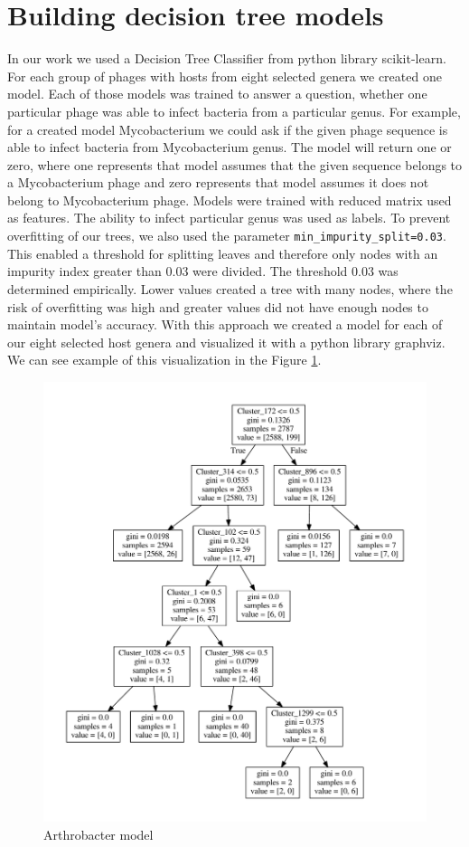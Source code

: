 \section{Building decision tree models}
In our work we used a Decision Tree Classifier from python library scikit-learn.
For each group of phages with hosts from eight selected genera we created one model.
Each of those models was trained to answer a question, whether one particular phage was able to infect bacteria from a particular genus.
For example, for a created model Mycobacterium we could ask if the given phage sequence is able to infect bacteria from Mycobacterium genus.
The model will return one or zero, where one represents that model assumes that the given sequence belongs to a Mycobacterium phage and zero represents that model assumes it does not belong to Mycobacterium phage.
Models were trained with reduced matrix used as features.
The ability to infect particular genus was used as labels.
To prevent overfitting of our trees, we also used the parameter \verb|min_impurity_split=0.03|.
This enabled a threshold for splitting leaves and therefore only nodes with an impurity index greater than 0.03 were divided.
The threshold 0.03 was determined empirically.
Lower values created a tree with many nodes, where the risk of overfitting was high and greater values did not have enough nodes to maintain model’s accuracy.
With this approach we created a model for each of our eight selected host genera and visualized it with a python library graphviz.
We can see example of this visualization in the Figure \ref{fig:tree}.

\begin{figure}[htp]
\includegraphics[width=\linewidth]{./images/tree.pdf}
\centering
\caption[Arthrobacter model]{Arthrobacter model}
\label{fig:tree}
\end{figure}


